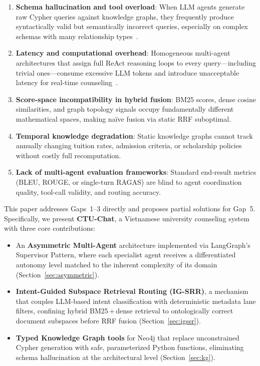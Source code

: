 \documentclass[runningheads]{llncs}
\begin{document}
\begin{enumerate}
    \item \textbf{Schema hallucination and tool overload}: When LLM agents generate raw Cypher queries against knowledge graphs, they frequently produce syntactically valid but semantically incorrect queries, especially on complex schemas with many relationship types~\cite{edge2024graphrag}.
    \item \textbf{Latency and computational overhead}: Homogeneous multi-agent architectures that assign full ReAct reasoning loops to every query---including trivial ones---consume excessive LLM tokens and introduce unacceptable latency for real-time counseling~\cite{yao2023react}.
    \item \textbf{Score-space incompatibility in hybrid fusion}: BM25 scores, dense cosine similarities, and graph topology signals occupy fundamentally different mathematical spaces, making na\"ive fusion via static RRF suboptimal.
    \item \textbf{Temporal knowledge degradation}: Static knowledge graphs cannot track annually changing tuition rates, admission criteria, or scholarship policies without costly full recomputation.
    \item \textbf{Lack of multi-agent evaluation frameworks}: Standard end-result metrics (BLEU, ROUGE, or single-turn RAGAS) are blind to agent coordination quality, tool-call validity, and routing accuracy.
\end{enumerate}

This paper addresses Gaps~1--3 directly and proposes partial solutions for Gap~5. Specifically, we present \textbf{CTU-Chat}, a Vietnamese university counseling system with three core contributions:

\begin{itemize}
    \item An \textbf{Asymmetric Multi-Agent} architecture implemented via LangGraph's Supervisor Pattern, where each specialist agent receives a differentiated autonomy level matched to the inherent complexity of its domain (Section~\ref{sec:asymmetric}).
    \item \textbf{Intent-Guided Subspace Retrieval Routing (IG-SRR)}, a mechanism that couples LLM-based intent classification with deterministic metadata lane filters, confining hybrid BM25\,+\,dense retrieval to ontologically correct document subspaces before RRF fusion (Section~\ref{sec:igssr}).
    \item \textbf{Typed Knowledge Graph tools} for Neo4j that replace unconstrained Cypher generation with safe, parameterized Python functions, eliminating schema hallucination at the architectural level (Section~\ref{sec:kg}).
\end{itemize}
\end{document}
